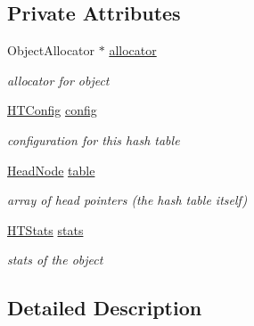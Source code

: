 \subsection*{Private Attributes}
\begin{DoxyCompactItemize}
\item 
\hypertarget{classChHashTable_a1c00c732ff4947ce2f79a6371db663c3}{Object\-Allocator $\ast$ \hyperlink{classChHashTable_a1c00c732ff4947ce2f79a6371db663c3}{allocator}}\label{classChHashTable_a1c00c732ff4947ce2f79a6371db663c3}

\begin{DoxyCompactList}\small\item\em allocator for object \end{DoxyCompactList}\item 
\hypertarget{classChHashTable_a81f3ca7a454daaef74c0a63c73ba842f}{\hyperlink{structChHashTable_1_1HTConfig}{H\-T\-Config} \hyperlink{classChHashTable_a81f3ca7a454daaef74c0a63c73ba842f}{config}}\label{classChHashTable_a81f3ca7a454daaef74c0a63c73ba842f}

\begin{DoxyCompactList}\small\item\em configuration for this hash table \end{DoxyCompactList}\item 
\hypertarget{classChHashTable_addc00bf3961d7a26c916a5fddbb7a822}{\hyperlink{classChHashTable_ab30f44a92efea296a6af396e9f583ab4}{Head\-Node} \hyperlink{classChHashTable_addc00bf3961d7a26c916a5fddbb7a822}{table}}\label{classChHashTable_addc00bf3961d7a26c916a5fddbb7a822}

\begin{DoxyCompactList}\small\item\em array of head pointers (the hash table itself) \end{DoxyCompactList}\item 
\hypertarget{classChHashTable_ac83bf0220f36893daa8e5afef17d1d2d}{\hyperlink{structHTStats}{H\-T\-Stats} \hyperlink{classChHashTable_ac83bf0220f36893daa8e5afef17d1d2d}{stats}}\label{classChHashTable_ac83bf0220f36893daa8e5afef17d1d2d}

\begin{DoxyCompactList}\small\item\em stats of the object \end{DoxyCompactList}\end{DoxyCompactItemize}


\subsection{Detailed Description}
